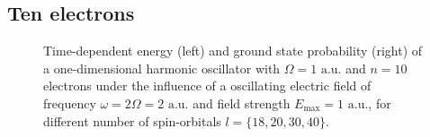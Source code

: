 \vfill
\pagebreak

\subsection*{Ten electrons}

\begin{figure}[!h]
    \centering
    \caption{Time-dependent energy (left) and ground state probability (right)
        of a one-dimensional harmonic oscillator with $\Omega=1 \text{ a.u.}$
        and $n=10$ electrons under the influence of a oscillating electric field 
        of frequency $\omega = 2 \Omega = 2 \text{ a.u.}$ and field strength
        $E_\text{max}=1 \text{ a.u.}$,
        for different number of spin-orbitals $l=\{18,20,30,40\}$.
    }
    \label{fig:1d_n10_qd}
\end{figure}

